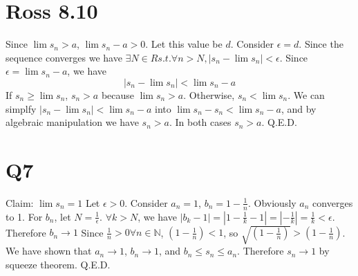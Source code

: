 \documentclass[12pt]{article}
\newcommand{\N}{\mathbb{N}}
\begin{document}
\section{Ross 8.10}
Since $\lim s_n > a$, $\lim s_n - a > 0$. Let this value be $d$.
\newline
Consider $\epsilon = d$. Since the sequence converges we have $\exists N \in R s.t. \forall n > N, |s_n - \lim s_n|<\epsilon$. Since $\epsilon = \lim s_n - a$, we have
$$|s_n - \lim s_n| < \lim s_n - a$$
If $s_n \geq \lim s_n$, $s_n > a$ because $\lim s_n > a$.
\newline
Otherwise, $s_n < \lim s_n$. We can simplfy $|s_n - \lim s_n| < \lim s_n - a$ into $ \lim s_n - s_n < \lim s_n - a$, and by algebraic manipulation we have $s_n > a$.
\newline
In both cases $s_n > a$. Q.E.D.
\newpage


\section{Q7}
Claim: $\lim s_n = 1$
\newline
Let $\epsilon > 0$. Consider $a_n = 1$, $b_n = 1-\frac{1}{n}$. Obviously $a_n$ converges to 1.
\newline
For $b_n$, let $N = \frac{1}{\epsilon}$. $\forall k > N$, we have $|b_k - 1| = |1-\frac{1}{k}-1| = |-\frac{1}{k}| = \frac{1}{k} < \epsilon$. Therefore $b_n \to 1$
\newline
Since $\frac{1}{n} > 0 \forall n \in \N$, $(1-\frac{1}{n})<1$, so $\sqrt{(1-\frac{1}{n})} > (1-\frac{1}{n})$.
\newline
We have shown that $a_n \to 1$, $b_n \to 1$, and $b_n \leq s_n \leq a_n$. Therefore $s_n \to 1$ by squeeze theorem.
\newline
Q.E.D.
\end{document}

